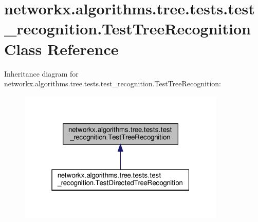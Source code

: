 \hypertarget{classnetworkx_1_1algorithms_1_1tree_1_1tests_1_1test__recognition_1_1TestTreeRecognition}{}\section{networkx.\+algorithms.\+tree.\+tests.\+test\+\_\+recognition.\+Test\+Tree\+Recognition Class Reference}
\label{classnetworkx_1_1algorithms_1_1tree_1_1tests_1_1test__recognition_1_1TestTreeRecognition}


Inheritance diagram for networkx.\+algorithms.\+tree.\+tests.\+test\+\_\+recognition.\+Test\+Tree\+Recognition\+:
\nopagebreak
\begin{figure}[H]
\begin{center}
\leavevmode
\includegraphics[width=280pt]{classnetworkx_1_1algorithms_1_1tree_1_1tests_1_1test__recognition_1_1TestTreeRecognition__inherit__graph}
\end{center}
\end{figure}
